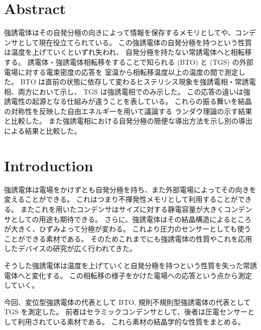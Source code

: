 \documentclass[9pt,dvipdfmx,a4paper]{jsarticle}
\begin{document}

\section{Abstract}
強誘電体はその自発分極の向きによって情報を保存するメモリとしてや、コンデンサとして現在役立てられている。
この強誘電体の自発分極を持つという性質は温度を上げていくといずれ失われ、
自発分極を持たない常誘電体へと相転移する。
誘電体・強誘電体相転移をすることで知られる
 (BTO) と  (TGS) の外部電場に対する電束密度の応答を
室温から相転移温度以上の温度の間で測定した。
BTO は直前の状態に依存して変わるヒステリシス現象を強誘電相・常誘電相、両方において示し、
TGS は強誘電相でのみ示した。
この応答の違いは強誘電性の起源となる仕組みが違うことを表している。
これらの振る舞いを結晶の対称性を反映した自由エネルギーを用いて議論する
ランダウ理論の示す結果と比較した。
また強誘電相における自発分極の簡便な導出方法を示し別の導出による結果と比較した。

\section{Introduction}
強誘電体は電場をかけずとも自発分極を持ち、また外部電場によってその向きを変えることができる。
これはつまり不揮発性メモリとして利用することができる。
またこれを用いたコンデンサはサイズに対する静電容量が大きくコンデンサとしての用途も期待できる。
さらに、強誘電体はその結晶構造によるところが大きく、ひずみよって分極が変わる。
これより圧力のセンサーとしても使うことができる素材である。
そのためこれまでにも強誘電体の性質やこれを応用したデバイスの研究が広く行われてきた。

そうした強誘電体は温度を上げていくと自発分極を持つという性質を失った常誘電体へと変化する。
この相転移の様子をかけた電場への応答という点から測定していく。

今回、変位型強誘電体の代表として BTO, 規則不規則型強誘電体の代表として TGS を測定した。
前者はセラミックコンデンサとして、後者は圧電センサーとして利用されている素材である。
これら素材の結晶学的な性質をまとめる。
\end{document}
